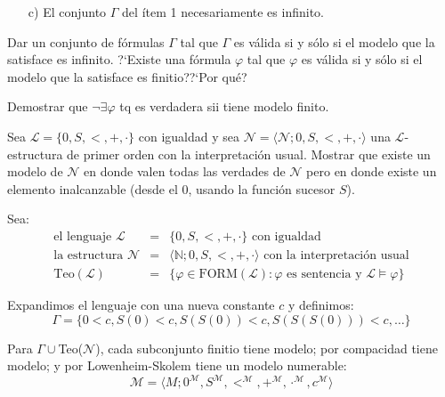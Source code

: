 \begin{questions}
\begin{enumerate}
  \item[c)] El conjunto $\Gamma$ del ítem 1 necesariamente es infinito.
\end{enumerate}


\question Dar un conjunto de f\'ormulas $\Gamma$ tal que $\Gamma$ es v\'alida si y s\'olo si el modelo que la satisface es infinito. ?`Existe una f\'ormula $\varphi$ tal que $\varphi$ es v\'alida si y s\'olo si el modelo que la satisface es finitio??`Por qu\'e?


\question Demostrar que $\neg\exists\varphi$ tq es verdadera sii tiene modelo finito.


\question Sea $\mathcal{L} = \{ 0, S, <, +, \cdot \}$ con igualdad y sea $\mathcal{N} = \langle \mathcal{N}; 0, S, <, +, \cdot \rangle$ una $\mathcal{L}$-estructura de primer orden con la interpretación usual. Mostrar que existe un modelo de $\mathcal{N}$ en donde valen todas las verdades de $\mathcal{N}$ pero en donde existe un elemento inalcanzable (desde el 0, usando la función sucesor $S$). \label{modelo-no-estandar}


\begin{solution}

 Sea:
 \begin{eqnarray*}
 \text{el lenguaje }\mathcal{L}&=&\{0,S,<,+,\cdotp\} \text{ con igualdad}\\
 \text{la estructura }\mathcal{N}&=&\langle\mathbb{N};0,S,<,+,\cdotp\rangle \text{ con la interpretaci\'on usual}\\
 \text{Teo}(\mathcal{L})&=&\{\varphi\in\text{FORM}(\mathcal{L}) : \varphi\text{ es sentencia y }\mathcal{L}\vDash\varphi\}
 \end{eqnarray*}

 Expandimos el lenguaje con una nueva constante $c$ y definimos: 
 \begin{equation*}
  \Gamma = \{0 < c, S(0)<c, S(S(0))<c, S(S(S(0)))<c, \dots\}
 \end{equation*}

  Para $\Gamma\cup$Teo($\mathcal{N}$), cada subconjunto finitio tiene modelo; por compacidad tiene modelo; y por Lowenheim-Skolem tiene un modelo numerable: 
  \begin{equation*}
   \mathcal{M} = \langle M;0^\mathcal{M}, S^\mathcal{M},<^\mathcal{M},+^\mathcal{M},\cdotp^\mathcal{M},c^\mathcal{M}\rangle
  \end{equation*}
  

\end{solution}
\end{questions}
